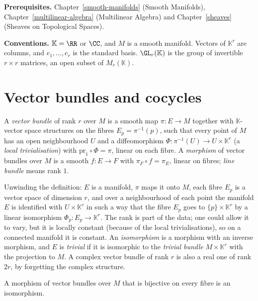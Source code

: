 \noindent\textbf{Prerequisites.} Chapter~\ref{smooth-manifolds} (Smooth Manifolds), Chapter~\ref{multilinear-algebra} (Multilinear Algebra) and Chapter~\ref{sheaves} (Sheaves on
Topological Spaces).

\noindent\textbf{Conventions.} $\mathbb{K} = \RR$ or $\CC$, and $M$ is a smooth manifold. Vectors of $\mathbb{K}^r$ are columns, and $e_1, \ldots, e_r$ is the standard basis.
$\GL_r(\mathbb{K})$ is the group of invertible $r \times r$ matrices, an open subset of $M_r(\mathbb{K})$.

\section{Vector bundles and cocycles}\label{vector-bundles:section-definition}

\begin{definition}\label{vector-bundles:definition-vector-bundle}
A \emph{vector bundle} of rank $r$ over $M$ is a smooth map $\pi \colon E \to M$ together with $\mathbb{K}$-vector space structures on the fibres $E_p = \pi^{-1}(p)$, such that every point of $M$ has an open
neighbourhood $U$ and a diffeomorphism $\Phi \colon \pi^{-1}(U) \to U \times \mathbb{K}^r$ (a \emph{local trivialisation}) with $\mathrm{pr}_1 \circ \Phi = \pi$, linear on each fibre. A \emph{morphism} of vector
bundles over $M$ is a smooth $f \colon E \to F$ with $\pi_F \circ f = \pi_E$, linear on fibres; \emph{line bundle} means rank $1$.
\end{definition}

Unwinding the definition: $E$ is a manifold, $\pi$ maps it onto $M$, each fibre $E_p$ is a vector space of dimension $r$, and over a neighbourhood of each point the manifold $E$
is identified with $U \times \mathbb{K}^r$ in such a way that the fibre $E_p$ goes to $\{p\} \times \mathbb{K}^r$ by a linear isomorphism $\Phi_p \colon E_p \to \mathbb{K}^r$.
The rank is part of the data; one could allow it to vary, but it is locally constant (because of the local trivialisations), so on a connected manifold it is constant. An
\emph{isomorphism} is a morphism with an inverse morphism, and $E$ is \emph{trivial} if it is isomorphic to the \emph{trivial bundle} $M \times \mathbb{K}^r$ with the projection
to $M$. A complex vector bundle of rank $r$ is also a real one of rank $2r$, by forgetting the complex structure.

\begin{lemma}\label{vector-bundles:lemma-bijective-morphism}
A morphism of vector bundles over $M$ that is bijective on every fibre is an isomorphism.
\end{lemma}

